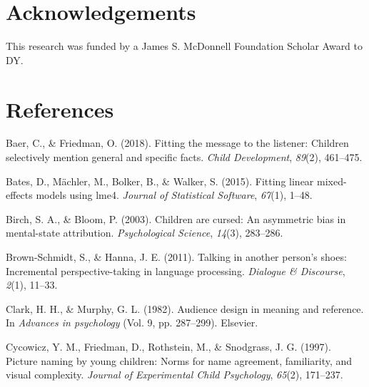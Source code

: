 \documentclass[10pt, letterpaper]{article}
\begin{document}
\vspace{1em} 

\hypertarget{acknowledgements}{%
\section{Acknowledgements}\label{acknowledgements}}

This research was funded by a James S. McDonnell Foundation Scholar
Award to DY.

\hypertarget{references}{%
\section{References}\label{references}}

\setlength{\parindent}{-0.1in} 
\setlength{\leftskip}{0.125in}

\noindent

\hypertarget{refs}{}
\leavevmode\hypertarget{ref-baer2018}{}%
Baer, C., \& Friedman, O. (2018). Fitting the message to the listener:
Children selectively mention general and specific facts. \emph{Child
Development}, \emph{89}(2), 461--475.

\leavevmode\hypertarget{ref-bates2015}{}%
Bates, D., Mächler, M., Bolker, B., \& Walker, S. (2015). Fitting linear
mixed-effects models using lme4. \emph{Journal of Statistical Software},
\emph{67}(1), 1--48.

\leavevmode\hypertarget{ref-birch2003}{}%
Birch, S. A., \& Bloom, P. (2003). Children are cursed: An asymmetric
bias in mental-state attribution. \emph{Psychological Science},
\emph{14}(3), 283--286.

\leavevmode\hypertarget{ref-brown-schmidt2011}{}%
Brown-Schmidt, S., \& Hanna, J. E. (2011). Talking in another person's
shoes: Incremental perspective-taking in language processing.
\emph{Dialogue \& Discourse}, \emph{2}(1), 11--33.

\leavevmode\hypertarget{ref-clark1982}{}%
Clark, H. H., \& Murphy, G. L. (1982). Audience design in meaning and
reference. In \emph{Advances in psychology} (Vol. 9, pp. 287--299).
Elsevier.

\leavevmode\hypertarget{ref-cycowicz1997}{}%
Cycowicz, Y. M., Friedman, D., Rothstein, M., \& Snodgrass, J. G.
(1997). Picture naming by young children: Norms for name agreement,
familiarity, and visual complexity. \emph{Journal of Experimental Child
Psychology}, \emph{65}(2), 171--237.
\end{document}
